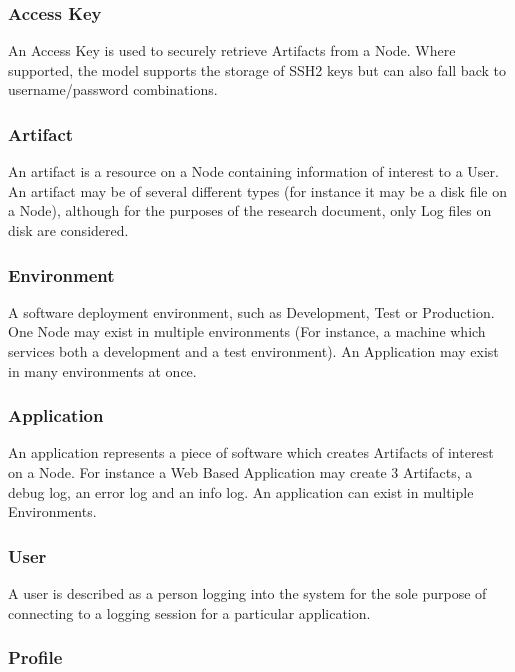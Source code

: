 \documentclass{llncs}
\begin{document}
\subsubsection{Access Key}

An Access Key is used to securely retrieve Artifacts from a Node. Where supported, the model supports the storage of SSH2 keys but can also fall back to username/password combinations.

\subsubsection{Artifact}

An artifact is a resource on a Node containing information of interest to a User. An artifact may be of several different types (for instance it may be a disk file on a Node), although for the purposes of the research document, only Log files on disk are considered.

\subsubsection{Environment}

A software deployment environment, such as Development, Test or Production. One Node may exist in multiple environments (For instance, a machine which services both a development and a test environment). An Application may exist in many environments at once.

\subsubsection{Application}

An application represents a piece of software which creates Artifacts of interest on a Node. For instance a Web Based Application may create 3 Artifacts, a debug log, an error log and an info log. An application can exist in multiple Environments.

\subsubsection{User}

A user is described as a person logging into the system for the sole purpose of connecting to a logging session for a particular application. 

\subsubsection{Profile}
\end{document}
